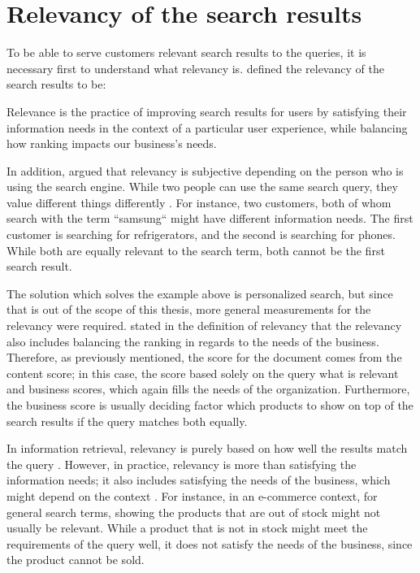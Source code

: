 \section{Relevancy of the search results}
\label{sec:relevancy}

To be able to serve customers relevant search results to the queries, it is necessary first to understand 
what relevancy is.
\citeauthor{relevantSearch} \cite{relevantSearch} defined the relevancy of the search results to be:
\begin{displayquote}
Relevance is the practice of improving search results for users by satisfying their 
information needs in the context of a particular user experience, 
while balancing how ranking impacts our business’s needs.
\end{displayquote}


In addition, \citeauthor{relevantSearch} \cite{relevantSearch} argued that
relevancy is subjective depending on the person who is using the search engine.
While two people can use the same search query, they value different things differently \cite{relevantSearch}.
For instance, two customers, both of whom search with the term ``samsung`` might have different 
information needs. 
The first customer is searching for refrigerators, and the second is searching for phones.
While both are equally relevant to the search term, both cannot be the first search result.


The solution which solves the example above is personalized search, but since that is out of the scope
of this thesis, more general measurements for the relevancy were required.
\citeauthor{relevantSearch} \cite{relevantSearch} stated in the definition of relevancy that the 
relevancy also includes balancing the ranking in regards to the needs of the business.
Therefore, as previously mentioned, the score for the document comes from the content score;
in this case, the score based solely on the query what is relevant and business scores,
which again fills the needs of the organization.
Furthermore, the business score is usually deciding factor which products to show on top 
of the search results if the query matches both equally.


In information retrieval, relevancy is purely based on how well the results match the query 
\cite{relevantSearch}.
However, in practice, relevancy is more than satisfying the information needs; 
it also includes satisfying the needs of the business, which might depend on the context 
\cite{relevantSearch}.
For instance, in an e-commerce context, for general search terms, 
showing the products that are out of stock might not usually be relevant. 
While a product that is not in stock might meet the requirements of the query well, 
it does not satisfy the needs of the business, since the product cannot be sold.


